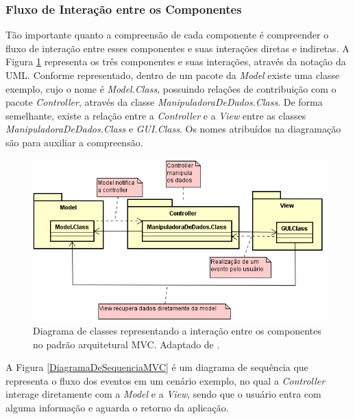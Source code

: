 \subsubsection{Fluxo de Interação entre os Componentes}
\label{subsubsec:fluxoDeInteracaoEntreOsComponentes}

Tão importante quanto a compreensão de cada componente é compreender o fluxo de interação entre esses componentes e suas interações diretas e indiretas. A Figura \ref{DiagramaDeClasseMVC} representa os três componentes e suas interações, através da notação da UML. Conforme representado, dentro de um pacote da \textit{Model} existe uma classe exemplo, cujo o nome é \textit{Model.Class}, possuindo relações de contribuição com o pacote \textit{Controller}, através da classe \textit{ManipuladoraDeDados.Class}. De forma semelhante, existe a relação entre a \textit{Controller} e a \textit{View} entre as classes  \textit{ManipuladoraDeDados.Class} e \textit{GUI.Class}. Os nomes atribuídos na diagramação são para auxiliar a compreensão. 

\begin{figure}[h!]
	\centering
	\includegraphics[keepaspectratio=true,scale=0.9]{figuras/DiagramaDeClasseMVC.PNG}
	\caption{Diagrama de classes representando a interação entre os componentes no padrão arquitetural MVC. Adaptado de \cite{durelli2008proposta}.}
	\label{DiagramaDeClasseMVC}
\end{figure}

\pagebreak

A Figura \ref{DiagramaDeSequenciaMVC} é um diagrama de sequência que representa o fluxo dos eventos em um cenário exemplo, no qual a \textit{Controller} interage diretamente com a \textit{Model} e a \textit{View}, sendo que o usuário entra com alguma informação e aguarda o retorno da aplicação. 


